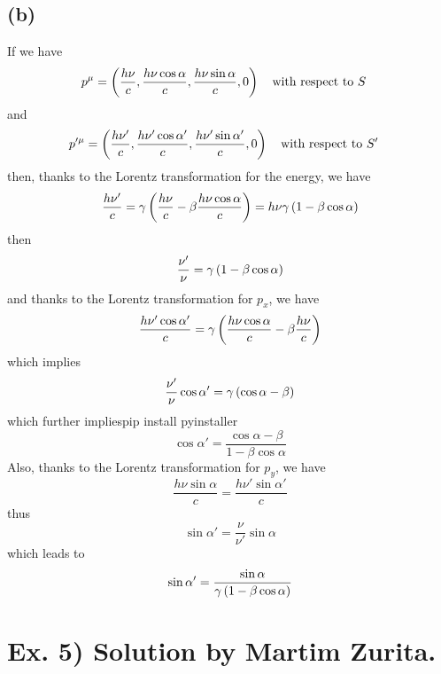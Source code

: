 \documentclass[oneside, 10pt, notitlepage]{book}
\begin{document}
\subsection*{(b)}
If we have
\begin{equation}
    p^{\mu} = \lr{\frac{h\nu}{c},\frac{h\nu\cos \alpha}{c},\frac{h\nu\sin \alpha}{c},0} \qq{with respect to \(S\)}
\end{equation}
and
\begin{equation}
    p'^{\mu} = \lr{\frac{h\nu'}{c},\frac{h\nu'\cos \alpha'}{c},\frac{h\nu'\sin \alpha'}{c},0} \qq{with respect to \(S'\)}
\end{equation}
then, thanks to the Lorentz transformation for the energy, we have
\begin{equation}
    \frac{h\nu'}{c} = \gamma \left(\frac{h\nu}{c} - \beta\frac{h\nu\cos \alpha}{c}\right) = h\nu \gamma \left(1-\beta \cos\alpha\right)
\end{equation}
then
\begin{equation}
    \frac{\nu'}{\nu} = \gamma \left(1-\beta \cos\alpha\right)
\end{equation}
and thanks to the Lorentz transformation for \(p_x\), we have
\begin{equation}
    \frac{h\nu'\cos \alpha'}{c} = \gamma \left(\frac{h\nu\cos \alpha}{c} - \beta \frac{h\nu}{c}\right)
\end{equation}
which implies
\begin{equation}
    \frac{\nu'}{\nu} \cos \alpha' = \gamma \left(\cos \alpha - \beta\right)
\end{equation}
which further impliespip install pyinstaller
\begin{equation}\label{eq:cosprime}
    \cos \alpha' = \frac{\cos \alpha -\beta}{1-\beta \cos \alpha}
\end{equation}
Also, thanks to the Lorentz transformation for \(p_y\), we have
\begin{equation}
    \frac{h\nu\sin \alpha}{c} = \frac{h\nu'\sin \alpha'}{c}
\end{equation}
thus
\begin{equation}
    \sin \alpha' = \frac{\nu}{\nu'}\sin \alpha
\end{equation}
which leads to
\begin{equation}\label{eq:sinprime}
    \sin \alpha' = \frac{\sin \alpha}{\gamma \left(1-\beta \cos\alpha\right)}
\end{equation}

\section*{Ex. 5) Solution by Martim Zurita.}
\end{document}
